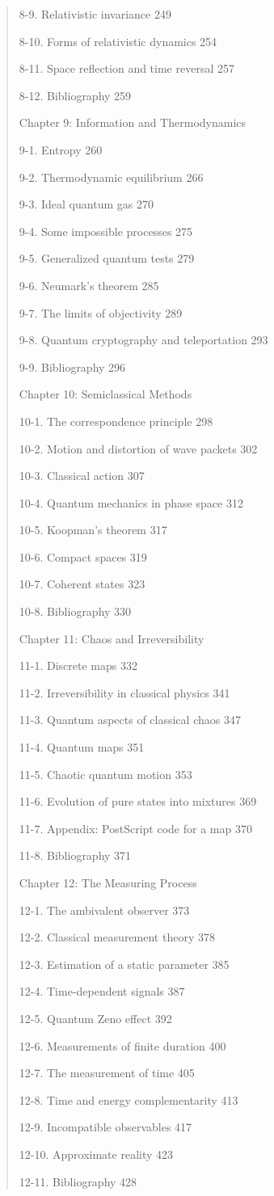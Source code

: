 \documentclass{article}
\begin{document}
\begin{quote}
8-9. Relativistic invariance 249

8-10. Forms of relativistic dynamics 254

8-11. Space reflection and time reversal 257

8-12. Bibliography 259

Chapter 9: Information and Thermodynamics

9-1. Entropy 260

9-2. Thermodynamic equilibrium 266

9-3. Ideal quantum gas 270

9-4. Some impossible processes 275

9-5. Generalized quantum tests 279

9-6. Neumark's theorem 285

9-7. The limits of objectivity 289

9-8. Quantum cryptography and teleportation 293

9-9. Bibliography 296

Chapter 10: Semiclassical Methods

10-1. The correspondence principle 298

10-2. Motion and distortion of wave packets 302

10-3. Classical action 307

10-4. Quantum mechanics in phase space 312

10-5. Koopman's theorem 317

10-6. Compact spaces 319

10-7. Coherent states 323

10-8. Bibliography 330

Chapter 11: Chaos and Irreversibility

11-1. Discrete maps 332

11-2. Irreversibility in classical physics 341

11-3. Quantum aspects of classical chaos 347

11-4. Quantum maps 351

11-5. Chaotic quantum motion 353

11-6. Evolution of pure states into mixtures 369

11-7. Appendix: PostScript code for a map 370

11-8. Bibliography 371

Chapter 12: The Measuring Process

12-1. The ambivalent observer 373

12-2. Classical measurement theory 378

12-3. Estimation of a static parameter 385

12-4. Time-dependent signals 387

12-5. Quantum Zeno effect 392

12-6. Measurements of finite duration 400

12-7. The measurement of time 405

12-8. Time and energy complementarity 413

12-9. Incompatible observables 417

12-10. Approximate reality 423

12-11. Bibliography 428
\end{quote}
\end{document}
